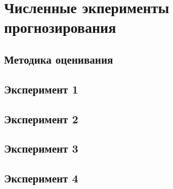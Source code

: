 \section{Численные экперименты прогнозирования}
\subsection{Методика оценивания}
\subsection{Эксперимент 1}
\subsection{Эксперимент 2}
\subsection{Эксперимент 3}
\subsection{Эксперимент 4}